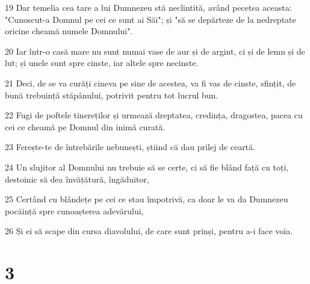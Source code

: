 \par 19 Dar temelia cea tare a lui Dumnezeu stă neclintită, având pecetea aceasta: "Cunoscut-a Domnul pe cei ce sunt ai Săi"; și "să se depărteze de la nedreptate oricine cheamă numele Domnului".
\par 20 Iar într-o casă mare nu sunt numai vase de aur și de argint, ci și de lemn și de lut; și unele sunt spre cinste, iar altele spre necinste.
\par 21 Deci, de se va curăți cineva pe sine de acestea, va fi vas de cinste, sfințit, de bună trebuință stăpânului, potrivit pentru tot lucrul bun.
\par 22 Fugi de poftele tinereților și urmează dreptatea, credința, dragostea, pacea cu cei ce cheamă pe Domnul din inimă curată.
\par 23 Ferește-te de întrebările nebunești, știind că dau prilej de ceartă.
\par 24 Un slujitor al Domnului nu trebuie să se certe, ci să fie blând față cu toți, destoinic să dea învățătură, îngăduitor,
\par 25 Certând cu blândețe pe cei ce stau împotrivă, ca doar le va da Dumnezeu pocăință spre cunoașterea adevărului,
\par 26 Și ei să scape din cursa diavolului, de care sunt prinși, pentru a-i face voia.

\chapter{3}

